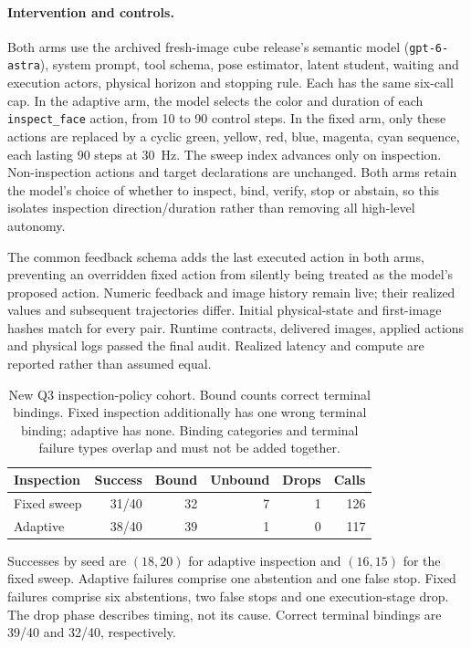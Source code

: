\paragraph{Intervention and controls.}
Both arms use the archived fresh-image cube release's semantic model (\texttt{gpt-6-astra}), system prompt, tool schema, pose estimator, latent student, waiting and execution actors, physical horizon and stopping rule. Each has the same six-call cap. In the adaptive arm, the model selects the color and duration of each \texttt{inspect\_face} action, from 10 to 90 control steps. In the fixed arm, only these actions are replaced by a cyclic green, yellow, red, blue, magenta, cyan sequence, each lasting 90 steps at 30~Hz. The sweep index advances only on inspection. Non-inspection actions and target declarations are unchanged. Both arms retain the model's choice of whether to inspect, bind, verify, stop or abstain, so this isolates inspection direction/duration rather than removing all high-level autonomy.

The common feedback schema adds the last executed action in both arms, preventing an overridden fixed action from silently being treated as the model's proposed action. Numeric feedback and image history remain live; their realized values and subsequent trajectories differ. Initial physical-state and first-image hashes match for every pair. Runtime contracts, delivered images, applied actions and physical logs passed the final audit. Realized latency and compute are reported rather than assumed equal.

\begin{table}[h]
\centering\small
\setlength{\tabcolsep}{3pt}
\begin{tabular}{lrrrrr}
\toprule
Inspection & Success & Bound & Unbound & Drops & Calls\\
\midrule
Fixed sweep & 31/40 & 32 & 7 & 1 & 126\\
Adaptive & 38/40 & 39 & 1 & 0 & 117\\
\bottomrule
\end{tabular}
\caption{New Q3 inspection-policy cohort. Bound counts correct terminal bindings. Fixed inspection additionally has one wrong terminal binding; adaptive has none. Binding categories and terminal failure types overlap and must not be added together.}
\label{tab:inspection-policy-supp}
\end{table}

Successes by seed are $(18,20)$ for adaptive inspection and $(16,15)$ for the fixed sweep. Adaptive failures comprise one abstention and one false stop. Fixed failures comprise six abstentions, two false stops and one execution-stage drop. The drop phase describes timing, not its cause. Correct terminal bindings are 39/40 and 32/40, respectively.

